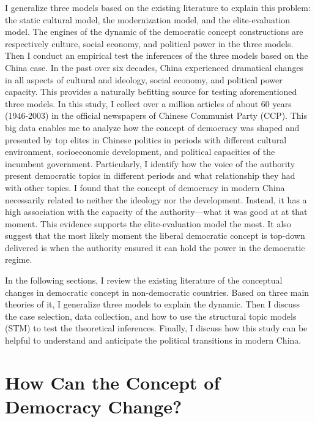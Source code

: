 \documentclass[abstracton,UTF8]{ctexart}
\begin{document}
I generalize three models based on the existing literature to explain this problem: the static cultural model, the modernization model, and the elite-evaluation model. The engines of the dynamic of the democratic concept constructions are respectively culture, social economy, and political power in the three models. Then I conduct an empirical test the inferences of the three models based on the China case. In the past over six decades, China experienced dramatical changes in all aspects of cultural and ideology, social economy, and political power capacity. This provides a naturally befitting source for testing aforementioned three models. In this study, I collect over a million articles of about 60 years (1946-2003) in the official newspapers of Chinese Communist Party (CCP). This big data enables me to analyze how the concept of democracy was shaped and presented by top elites in Chinese politics in periods with different cultural environment, socioeconomic development, and political capacities of the incumbent government. Particularly, I identify how the voice of the authority present democratic topics in different periods and what relationship they had with other topics. I found that the concept of democracy in modern China necessarily related to neither the ideology nor the development. Instead, it has a high association with the capacity of the authority---what it was good at at that moment. This evidence supports the elite-evaluation model the most. It also suggest that the most likely moment the liberal democratic concept is top-down delivered is when the authority ensured it can hold the power in the democratic regime. 

In the following sections, I review the existing literature of the conceptual changes in democratic concept in non-democratic countries. Based on three main theories of it, I generalize three models to explain the dynamic. Then I discuss the case selection, data collection, and how to use the structural topic models (STM) to test the theoretical inferences. Finally, I discuss how this study can be helpful to understand and anticipate the political transitions in modern China.
	
\section{How Can the Concept of Democracy Change?}
\end{document}
